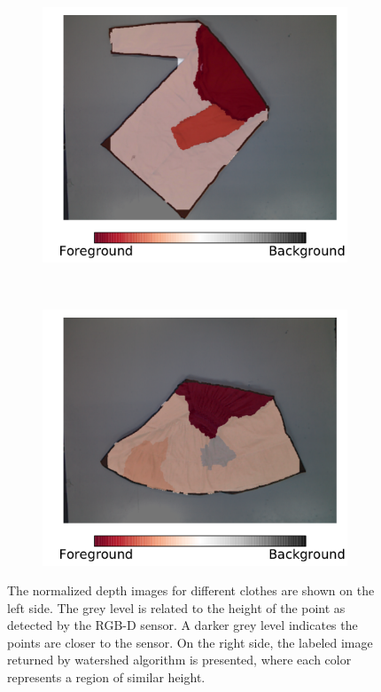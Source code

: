 \begin{figure}[htbp]
\begin{subfigure}[r]{0.49\textwidth}
	\end{subfigure}
	~
	\begin{subfigure}[l]{0.49\textwidth}
	    \centering
    	\includegraphics[width=\textwidth]
    	{figures/clustering/robe19-clustering.pdf}
	\end{subfigure}
	~
    \begin{subfigure}[r]{0.49\textwidth}
	    \centering
    	\includegraphics[width=\textwidth]
    	{figures/clustering/skirt17-clustering.pdf}
	\end{subfigure} 
    \caption[The normalized depth images for different clothes are shown on the left side.]
    {The normalized depth images for different clothes are shown on the left side. The grey level is related to the height of the point as detected by the RGB-D sensor. A darker grey level indicates the points are closer to the sensor. On the right side, the labeled image returned by watershed algorithm is presented, where each color represents a region of similar height.}
    \label{fig:watershed_labels}
\end{figure}